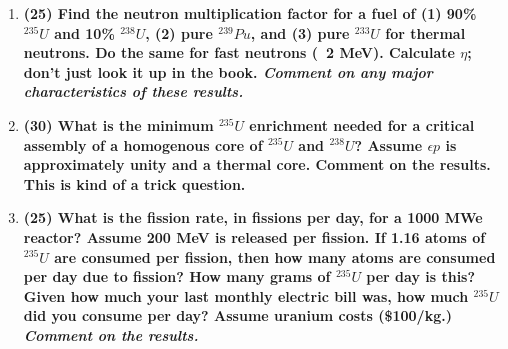 \documentclass[11pt,a4paper]{article}
\begin{document}
\begin{enumerate}[leftmargin=*,topsep=0pt,font=\bfseries]
    \item\textbf{(25) Find the neutron multiplication factor for a fuel of (1) 90\% $^{235}U$ and 10\% $^{238}U$, (2) pure $^{239}Pu$, and (3) pure $^{233}U$ for thermal neutrons. Do the same for fast neutrons (~2 MeV). Calculate $\eta$; don't just look it up in the book. \textit{Comment on any major characteristics of these results.}}
        \vspace{0.25in}\\

        
        
        
        
        
        
        
        
        
        
        
        
        
        
        \newpage 
    \item\textbf{(30) What is the minimum $^{235}U$ enrichment needed for a critical assembly of a homogenous core of $^{235}U$ and $^{238}U$? Assume $\epsilon p$ is approximately unity and a thermal core. Comment on the results. This is kind of a trick question.}
        \vspace{0.25in}\\
















        \newpage 
    \item\textbf{(25) What is the fission rate, in fissions per day, for a 1000 MWe reactor? Assume 200 MeV is released per fission. If 1.16 atoms of $^{235}U$ are consumed per fission, then how many atoms are consumed per day due to fission? How many grams of $^{235}U$ per day is this? Given how much your last monthly electric bill was, how much $^{235}U$ did you consume per day?  Assume uranium costs (\$100/kg.) \textit{Comment on the results.}}
        \vspace{0.25in}\\
















\end{enumerate}
\end{document}
